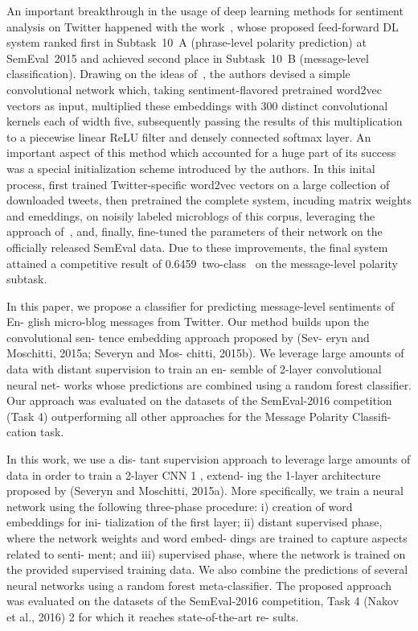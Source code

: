 
An important breakthrough in the usage of deep learning methods for
sentiment analysis on Twitter happened with the
work~\citet{Severyn:15}, whose proposed feed-forward DL system ranked
first in Subtask~10~A (phrase-level polarity prediction) at
SemEval~2015 \cite{Rosenthal:15} and achieved second place in
Subtask~10~B (message-level classification).  Drawing on the ideas
of~\citet{Kalchbrenner:14}, the authors devised a simple convolutional
network which, taking sentiment-flavored pretrained word2vec vectors
as input, multiplied these embeddings with 300 distinct convolutional
kernels each of width five, subsequently passing the results of this
multiplication to a piecewise linear ReLU filter and densely connected
softmax layer.  An important aspect of this method which accounted for
a huge part of its success was a special initialization scheme
introduced by the authors.  In this inital process,
\citeauthor{Severyn:15} first trained Twitter-specific word2vec
vectors on a large collection of downloaded tweets, then pretrained
the complete system, incuding matrix weights and emeddings, on noisily
labeled microblogs of this corpus, leveraging the approach
of~\citeauthor{Go:09}, and, finally, fine-tuned the parameters of
their network on the officially released SemEval data.  Due to these
improvements, the final system attained a competitive result of
0.6459~two-class~\F{} on the message-level polarity subtask.



In this paper, we propose a classifier for
predicting message-level sentiments of En-
glish micro-blog messages from Twitter. Our
method builds upon the convolutional sen-
tence embedding approach proposed by (Sev-
eryn and Moschitti, 2015a; Severyn and Mos-
chitti, 2015b). We leverage large amounts of
data with distant supervision to train an en-
semble of 2-layer convolutional neural net-
works whose predictions are combined using
a random forest classifier. Our approach was
evaluated on the datasets of the SemEval-2016
competition (Task 4) outperforming all other
approaches for the Message Polarity Classifi-
cation task.

In this work, we use a dis- tant supervision approach to leverage large
amounts of data in order to train a 2-layer CNN 1 , extend- ing the
1-layer architecture proposed by (Severyn and Moschitti, 2015a). More
specifically, we train a neural network using the following
three-phase procedure: i) creation of word embeddings for ini-
tialization of the first layer; ii) distant supervised phase, where
the network weights and word embed- dings are trained to capture
aspects related to senti- ment; and iii) supervised phase, where the
network is trained on the provided supervised training data.  We also
combine the predictions of several neural networks using a random
forest meta-classifier. The proposed approach was evaluated on the
datasets of the SemEval-2016 competition, Task 4 (Nakov et al., 2016)
2 for which it reaches state-of-the-art re- sults.

